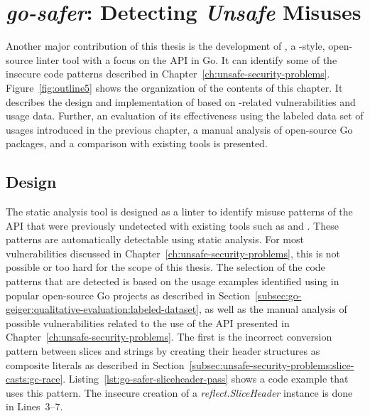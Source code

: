 
\chapter{\textit{go-safer}: Detecting \textit{Unsafe} Misuses}\label{ch:go-safer}

Another major contribution of this thesis is the development of \toolSafer{}, a \toolVet{}-style, open-source linter
tool with a focus on the \unsafe{} \acrshort{API} in Go.
It can identify some of the insecure code patterns described in Chapter~\ref{ch:unsafe-security-problems}.
Figure~\ref{fig:outline5} shows the organization of the contents of this chapter.
It describes the design and implementation of \toolSafer{} based on \unsafe{}-related vulnerabilities and usage data.
Further, an evaluation of its effectiveness using the labeled data set of \unsafe{} usages introduced in the
previous chapter, a manual analysis of open-source Go packages, and a comparison with existing tools is presented.





\section{Design}\label{sec:go-safer:design}

The \toolSafer{} static analysis tool is designed as a linter to identify  misuse patterns of the
\unsafe{} \acrshort{API} that were previously undetected with existing tools such as \toolVet{} and \toolGosec{}.
These patterns are automatically detectable using static analysis.
For most vulnerabilities discussed in Chapter~\ref{ch:unsafe-security-problems}, this is not possible or too hard for
the scope of this thesis.
The selection of the code patterns that are detected is based on the \unsafe{} usage examples identified using
\toolGeiger{} in popular open-source Go projects as described in
Section~\ref{subsec:go-geiger:qualitative-evaluation:labeled-dataset}, as well as the manual analysis of possible
vulnerabilities related to the use of the \unsafe{} \acrshort{API} presented in
Chapter~\ref{ch:unsafe-security-problems}.
The first is the incorrect conversion pattern between slices and strings by creating their header structures as
composite literals as described in Section~\ref{subsec:unsafe-security-problems:slice-casts:gc-race}.
Listing~\ref{lst:go-safer-sliceheader-pass} shows a code example that uses this pattern.
The insecure creation of a \textit{reflect.SliceHeader} instance is done in Lines~3--7.

